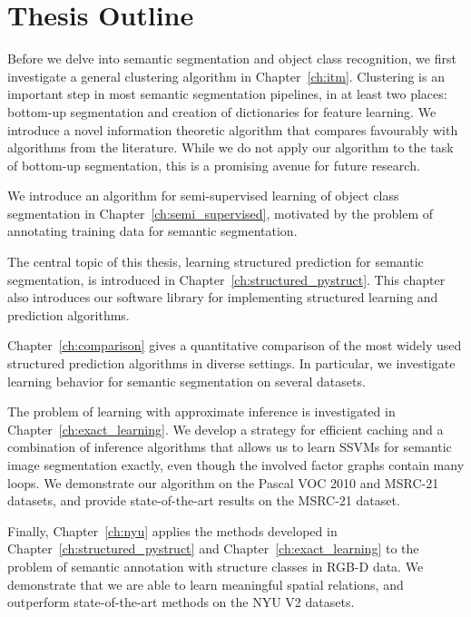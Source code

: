 \section{Thesis Outline}
Before we delve into semantic segmentation and object class recognition, we
first investigate a general clustering algorithm in Chapter~\ref{ch:itm}.
Clustering is an important step in most semantic segmentation pipelines, in at
least two places: bottom-up segmentation and creation of dictionaries for
feature learning. We introduce a novel information theoretic algorithm that
compares favourably with algorithms from the literature.  While we do not apply
our algorithm to the task of bottom-up segmentation, this is a promising avenue
for future research.

We introduce an algorithm for semi-supervised learning of object class
segmentation in Chapter~\ref{ch:semi_supervised}, motivated by the problem of
annotating training data for semantic segmentation.

The central topic of this thesis, learning structured prediction for semantic
segmentation, is introduced in Chapter~\ref{ch:structured_pystruct}. This
chapter also introduces our software library for implementing structured
learning and prediction algorithms.

Chapter~\ref{ch:comparison} gives a quantitative comparison of the most widely
used structured prediction algorithms in diverse settings.
In particular, we investigate learning behavior for
semantic segmentation on several datasets.

The problem of learning with approximate inference is investigated in
Chapter~\ref{ch:exact_learning}.  We develop a strategy for efficient caching
and a combination of inference algorithms that allows us to learn SSVMs for
semantic image segmentation exactly, even though the involved factor graphs
contain many loops. We demonstrate our algorithm on the Pascal VOC 2010 and MSRC-21 datasets,
and provide state-of-the-art results on the MSRC-21 dataset.

Finally, Chapter~\ref{ch:nyu} applies the methods developed in
Chapter~\ref{ch:structured_pystruct} and Chapter~\ref{ch:exact_learning} to the
problem of semantic annotation with structure classes in RGB-D data. We
demonstrate that we are able to learn meaningful spatial relations, and outperform
state-of-the-art methods on the NYU V2 datasets.

